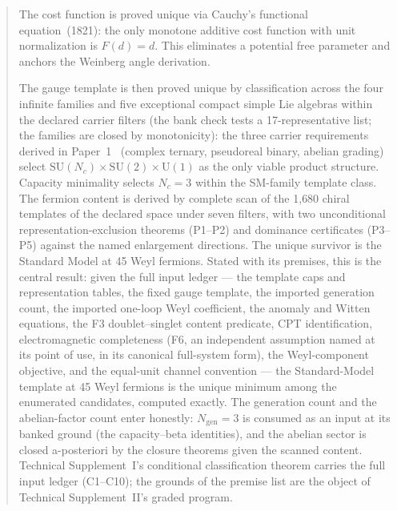 \documentclass[11pt]{article}
\newcommand{\SU}{\mathrm{SU}}
\newcommand{\U}{\mathrm{U}}
\begin{document}
\begin{abstract}
The cost function is proved unique via Cauchy's functional equation~(1821): the only monotone additive cost function with unit normalization is $F(d) = d$.  This eliminates a potential free parameter and anchors the Weinberg angle derivation.

The gauge template is then proved unique by classification across the four infinite families and five exceptional compact simple Lie algebras within the declared carrier filters (the bank check tests a 17-representative list; the families are closed by monotonicity): the three carrier requirements derived in Paper~1~\cite{BrookePaper1} (complex ternary, pseudoreal binary, abelian grading) select $\SU(N_c) \times \SU(2) \times \U(1)$ as the only viable product structure.  Capacity minimality selects $N_c = 3$ within the SM-family template class.  The fermion content is derived by complete scan of the 1{,}680 chiral templates of the declared space under seven filters, with two unconditional representation-exclusion theorems (P1--P2) and dominance certificates (P3--P5) against the named enlargement directions.  The unique survivor is the Standard Model at 45 Weyl fermions.  Stated with its premises, this is the central result: given the full input ledger --- the template caps and representation tables, the fixed gauge template, the imported generation count, the imported one-loop Weyl coefficient, the anomaly and Witten equations, the F3 doublet--singlet content predicate, CPT identification, electromagnetic completeness (F6, an independent assumption named at its point of use, in its canonical full-system form), the Weyl-component objective, and the equal-unit channel convention --- the Standard-Model template at 45 Weyl fermions is the unique minimum among the enumerated candidates, computed exactly.  The generation count and the abelian-factor count enter honestly: $N_{\mathrm{gen}} = 3$ is consumed as an input at its banked ground (the capacity--beta identities), and the abelian sector is closed a-posteriori by the closure theorems given the scanned content.  Technical Supplement~I's conditional classification theorem carries the full input ledger (C1--C10); the grounds of the premise list are the object of Technical Supplement~II's graded program.


\end{abstract}
\end{document}
